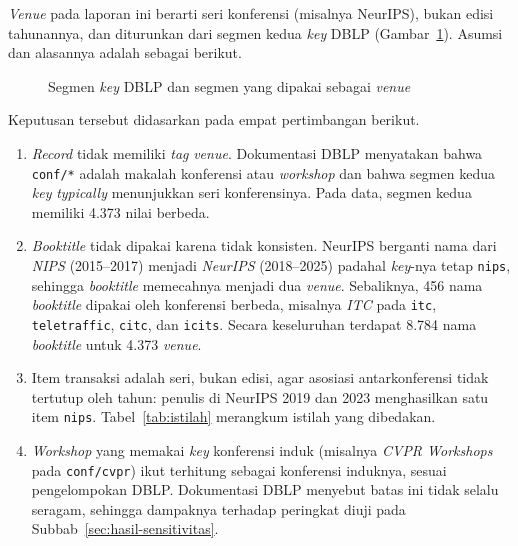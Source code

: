 \textit{Venue} pada laporan ini berarti seri konferensi (misalnya NeurIPS), bukan edisi tahunannya, dan diturunkan dari segmen kedua \textit{key} DBLP (Gambar~\ref{fig:anatomi-key}). Asumsi dan alasannya adalah sebagai berikut.

\begin{figure}[!htb]
\centering
{}
\caption{Segmen \textit{key} DBLP dan segmen yang dipakai sebagai \textit{venue}}
\label{fig:anatomi-key}
\end{figure}

Keputusan tersebut didasarkan pada empat pertimbangan berikut.
\begin{enumerate}
\item \textit{Record} tidak memiliki \textit{tag} \textit{venue}. Dokumentasi DBLP \cite{ley2009} menyatakan bahwa \texttt{conf/*} adalah makalah konferensi atau \textit{workshop} dan bahwa segmen kedua \textit{key} \textit{typically} menunjukkan seri konferensinya. Pada data, segmen kedua memiliki 4.373 nilai berbeda.
\item \textit{Booktitle} tidak dipakai karena tidak konsisten. NeurIPS berganti nama dari \textit{NIPS} (2015--2017) menjadi \textit{NeurIPS} (2018--2025) padahal \textit{key}-nya tetap \texttt{nips}, sehingga \textit{booktitle} memecahnya menjadi dua \textit{venue}. Sebaliknya, 456 nama \textit{booktitle} dipakai oleh konferensi berbeda, misalnya \textit{ITC} pada \texttt{itc}, \texttt{teletraffic}, \texttt{citc}, dan \texttt{icits}. Secara keseluruhan terdapat 8.784 nama \textit{booktitle} untuk 4.373 \textit{venue}.
\item Item transaksi adalah seri, bukan edisi, agar asosiasi antarkonferensi tidak tertutup oleh tahun: penulis di NeurIPS 2019 dan 2023 menghasilkan satu item \texttt{nips}. Tabel~\ref{tab:istilah} merangkum istilah yang dibedakan.
\item \textit{Workshop} yang memakai \textit{key} konferensi induk (misalnya \textit{CVPR Workshops} pada \texttt{conf/cvpr}) ikut terhitung sebagai konferensi induknya, sesuai pengelompokan DBLP. Dokumentasi DBLP menyebut batas ini tidak selalu seragam, sehingga dampaknya terhadap peringkat diuji pada Subbab~\ref{sec:hasil-sensitivitas}.
\end{enumerate}

